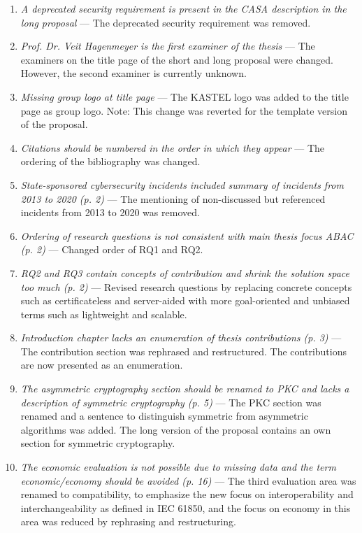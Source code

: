 \begin{enumerate}[label=Q\arabic*.]
    \item \textit{A deprecated security requirement is present in the CASA description in the long proposal} --- The deprecated security requirement was removed.
    \item \textit{Prof. Dr. Veit Hagenmeyer is the first examiner of the thesis} --- The examiners on the title page of the short and long proposal were changed. However, the second examiner is currently unknown.
    \item \textit{Missing group logo at title page} --- The KASTEL logo was added to the title page as group logo. Note: This change was reverted for the template version of the proposal.
    \item \textit{Citations should be numbered in the order in which they appear} --- The ordering of the bibliography was changed.
    \item \textit{State-sponsored cybersecurity incidents included summary of incidents from 2013 to 2020 (p. 2)} --- The mentioning of non-discussed but referenced incidents from 2013 to 2020 was removed.
    \item \textit{Ordering of research questions is not consistent with main thesis focus ABAC (p. 2)} --- Changed order of RQ1 and RQ2.
    \item \textit{RQ2 and RQ3 contain concepts of contribution and shrink the solution space too much (p. 2)} --- Revised research questions by replacing concrete concepts such as certificateless and server-aided with more goal-oriented and unbiased terms such as lightweight and scalable.
    \item \textit{Introduction chapter lacks an enumeration of thesis contributions (p. 3)} --- The contribution section was rephrased and restructured. The contributions are now presented as an enumeration.
    \item \textit{The asymmetric cryptography section should be renamed to PKC and lacks a description of symmetric cryptography (p. 5)} --- The PKC section was renamed and a sentence to distinguish symmetric from asymmetric algorithms was added. The long version of the proposal contains an own section for symmetric cryptography.
    \item \textit{The economic evaluation is not possible due to missing data and the term economic/economy should be avoided (p. 16)} --- The third evaluation area was renamed to compatibility, to emphasize the new focus on interoperability and interchangeability as defined in IEC 61850, and the focus on economy in this area was reduced by rephrasing and restructuring.

\end{enumerate}
